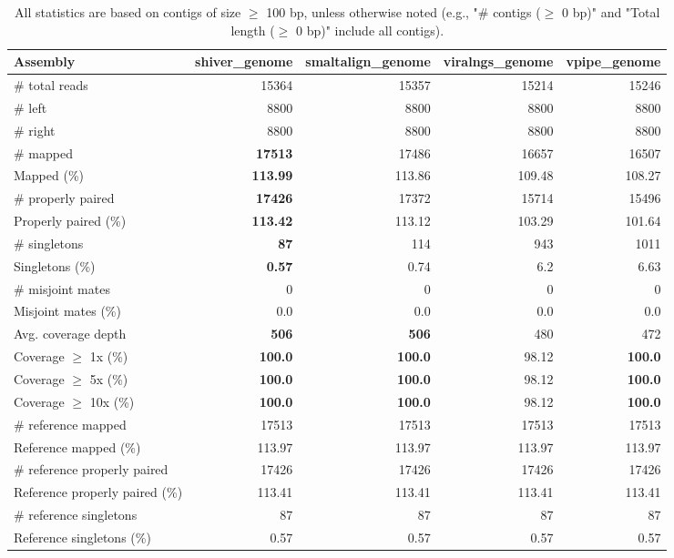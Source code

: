 \documentclass[12pt,a4paper]{article}
\begin{document}
\begin{table}[ht]
\begin{center}
\caption{All statistics are based on contigs of size $\geq$ 100 bp, unless otherwise noted (e.g., "\# contigs ($\geq$ 0 bp)" and "Total length ($\geq$ 0 bp)" include all contigs).}
\begin{tabular}{|l*{4}{|r}|}
\hline
Assembly & shiver\_genome & smaltalign\_genome & viralngs\_genome & vpipe\_genome \\ \hline
\# total reads & 15364 & 15357 & 15214 & 15246 \\ \hline
\# left & 8800 & 8800 & 8800 & 8800 \\ \hline
\# right & 8800 & 8800 & 8800 & 8800 \\ \hline
\# mapped & {\bf 17513} & 17486 & 16657 & 16507 \\ \hline
Mapped (\%) & {\bf 113.99} & 113.86 & 109.48 & 108.27 \\ \hline
\# properly paired & {\bf 17426} & 17372 & 15714 & 15496 \\ \hline
Properly paired (\%) & {\bf 113.42} & 113.12 & 103.29 & 101.64 \\ \hline
\# singletons & {\bf 87} & 114 & 943 & 1011 \\ \hline
Singletons (\%) & {\bf 0.57} & 0.74 & 6.2 & 6.63 \\ \hline
\# misjoint mates & 0 & 0 & 0 & 0 \\ \hline
Misjoint mates (\%) & 0.0 & 0.0 & 0.0 & 0.0 \\ \hline
Avg. coverage depth & {\bf 506} & {\bf 506} & 480 & 472 \\ \hline
Coverage $\geq$ 1x (\%) & {\bf 100.0} & {\bf 100.0} & 98.12 & {\bf 100.0} \\ \hline
Coverage $\geq$ 5x (\%) & {\bf 100.0} & {\bf 100.0} & 98.12 & {\bf 100.0} \\ \hline
Coverage $\geq$ 10x (\%) & {\bf 100.0} & {\bf 100.0} & 98.12 & {\bf 100.0} \\ \hline
\# reference mapped & 17513 & 17513 & 17513 & 17513 \\ \hline
Reference mapped (\%) & 113.97 & 113.97 & 113.97 & 113.97 \\ \hline
\# reference properly paired & 17426 & 17426 & 17426 & 17426 \\ \hline
Reference properly paired (\%) & 113.41 & 113.41 & 113.41 & 113.41 \\ \hline
\# reference singletons & 87 & 87 & 87 & 87 \\ \hline
Reference singletons (\%) & 0.57 & 0.57 & 0.57 & 0.57 \\ \hline

\end{tabular}
\end{center}
\end{table}
\end{document}
